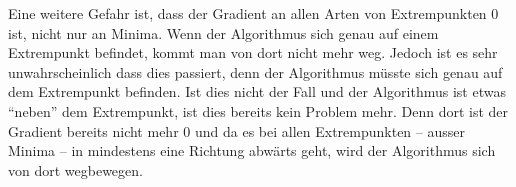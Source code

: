 Eine weitere Gefahr ist, dass der Gradient an allen Arten von Extrempunkten 0 ist, nicht nur an Minima.
Wenn der Algorithmus sich genau auf einem Extrempunkt befindet, kommt man von dort nicht mehr weg.
Jedoch ist es sehr unwahrscheinlich dass dies passiert, denn der Algorithmus müsste sich genau auf dem Extrempunkt befinden.
Ist dies nicht der Fall und der Algorithmus ist etwas ``neben'' dem Extrempunkt, ist dies bereits kein Problem mehr.
Denn dort ist der Gradient bereits nicht mehr 0 und da es bei allen Extrempunkten -- ausser Minima -- in mindestens eine Richtung abwärts geht, wird der Algorithmus sich von dort wegbewegen.

